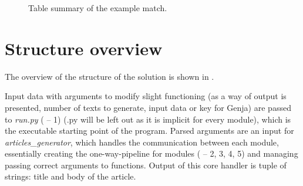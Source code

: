 \begin{figure}[H]
	\caption{Table summary of the example match.}
	\label{fig:overview}
\end{figure}

\section{Structure overview}
The overview of the structure of the solution is shown in .

Input data with arguments to modify slight functioning (as a way of output is presented, number of texts to generate, input data or key for Genja) are passed to \emph{run.py} ( -- 1) (.py will be left out as it is implicit for every module), which is the executable starting point of the program. Parsed arguments are an input for \emph{articles\_generator}, which handles the communication between each module, essentially creating the one-way-pipeline for modules ( -- 2, 3, 4, 5) and managing passing correct arguments to functions. Output of this core handler is tuple of strings: title and body of the article.

